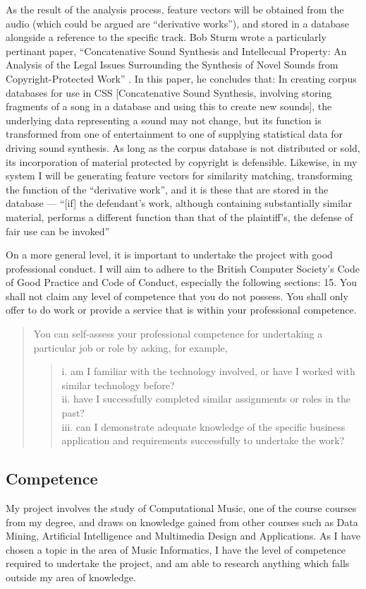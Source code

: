 As the result of the analysis process, feature vectors will be obtained from the
audio (which could be argued are ``derivative works''), and stored in a database
alongside a reference to the specific track. Bob Sturm wrote a particularly
pertinant paper, ``Concatenative Sound Synthesis and Intellecual Property: An
Analysis of the Legal Issues Surrounding the Synthesis of Novel Sounds from
Copyright-Protected Work'' \citep{Sturm2006}. In this paper, he concludes that:
In creating corpus databases for use in CSS [Concatenative Sound
Synthesis, involving storing fragments of a song in a database and
using this to create new sounds], the underlying data representing a
sound may not change, but its function is transformed from one of
entertainment to one of supplying statistical data for driving sound
synthesis. As long as the corpus database is not distributed or sold,
its incorporation of material protected by copyright is defensible.
Likewise, in my system I will be generating feature vectors for similarity matching, transforming the function of the ``derivative work'', and it is these that
are stored in the database — ``[if] the defendant's work, although containing
substantially similar material, performs a different function than that of the
plaintiff's, the defense of fair use can be invoked'' \citep{Copyright1988}

On a more general level, it is important to undertake the project with good
professional conduct. I will aim to adhere to the British Computer Society's
Code of Good Practice and Code of Conduct, especially the following sections:
15. You shall not claim any level of competence that you do not
possess. You shall only offer to do work or provide a service that is
within your professional competence.
\begin{quotation}\noindent
You can self-assess your professional competence for undertaking a particular job or role by asking, for example,
\begin{quotation}\noindent
i. am I familiar with the technology involved, or have I worked with
similar technology before?\\
ii. have I successfully completed similar assignments or roles in the
past?\\
iii. can I demonstrate adequate knowledge of the specific business
application and requirements successfully to undertake the work?
\end{quotation}
\end{quotation}
\subsection{Competence}
My project involves the study of Computational Music, one of the course courses
from my degree, and draws on knowledge gained from other courses such as
Data Mining, Artificial Intelligence and Multimedia Design and Applications.
As I have chosen a topic in the area of Music Informatics, I have the level of
competence required to undertake the project, and am able to research anything
which falls outside my area of knowledge.

